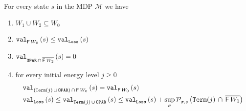 \documentclass[a4paper,UKenglish,cleveref,autoref,thm-restate]{lipics-v2021}
\DeclareMathOperator{\Term}{\mathtt{Term}}
\DeclareMathOperator{\Loss}{\mathtt{Loss}}
\newcommand{\Oparity}{\mathtt{OPAR}}
\newcommand{\+}[1]{\mathbb{#1}}
\newcommand{\?}[1]{\mathcal{#1}}
\newcommand{\Prob}[2][]{\mathcal{P}^{#1}_{#2}}
\newcommand{\eventually}{{\sf F}}
\newcommand{\lrc}[1]{\left(#1\right)}
\newcommand{\mdp}{{\mathcal M}}
\newcommand{\s}{s}
\newcommand{\complementof}[1]{\overline{#1}}
\newcommand{\zstrat}{\sigma}
\begin{document}
\begin{lemma}\label{lem:W0-W1-W2}
	For every state $\s$ in the MDP $\mdp$ we have
	\begin{enumerate}
		\item $W_1 \cup W_2 \subseteq W_0$ \label{itm:Wi sub W}
		\item $\valueof[][\eventually\, {W_0}]{\s} \le \valueof[][\Loss]{\s}$\label{itm:Fw lessequal nus}
		\item $\valueof[][\Oparity \,\cap \, \complementof{\eventually\, {W_2}}]{\s} = 0$ \label{itm:val_parcapcompW2 = 0}
		\item for every initial energy level $j \ge 0$
		      \begin{align}
			       & \valueof[][\lrc{\Term(j) \, \cup \, \Oparity}\,\cap\, \eventually\, W_0]{\s} = \valueof[][\eventually\, W_0]{\s} \label{eq:valTermcapFW = valFW}                                                                                                     \\
			       & \valueof[][\Loss]{\s} \le \valueof[][\Term(j)\, \cup\, \Oparity]{\s}  \le \valueof[][\Loss]{\s} + \sup_{\zstrat}\Prob[]{\zstrat,\s} \left(\Term(j)\, \cap \, \complementof{\eventually\, {W_1}}\right) \label{eq:nus+extra}
		      \end{align}
	\end{enumerate}
\end{lemma}
\end{document}
